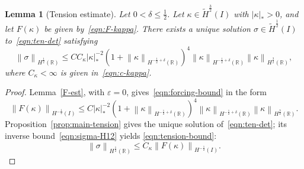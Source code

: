 \documentclass[11pt,reqno]{amsart}
\theoremstyle{plain}
\newtheorem{lemma}[theorem]{Lemma}
\theoremstyle{definition}
\numberwithin{equation}{section}
\newcommand{\paren}[1]{\left(#1\right)}
\newcommand{\wt}[1]{\widetilde{#1}}
\newcommand{\abs}[1]{\left\lvert #1 \right\rvert}
\newcommand{\norm}[1]{\left\lVert #1 \right\rVert}
\newcommand{\R}{\mathbb{R}}
\newcommand{\hi}[1]{H^{#1}(I)}
\newcommand{\thi}[1]{\wt H^{#1}(I)}
\newcommand{\hr}[1]{H^{#1}(\R)}
\begin{document}
\begin{lemma}[Tension estimate]\label{sigma-est-F}
Let $0<\delta\le\frac12$.
Let $\kappa\in\thi{\frac{3}{2}}$ with $\abs{\kappa}_*>0$, and let
$F(\kappa)$ be given by~\eqref{eqn:F-kappa}. There exists a unique solution
$\sigma\in\thi{\frac{1}{2}}$ to~\eqref{eqn:ten-det} satisfying
\begin{equation}\label{eqn:tension-bound}
    \norm{\sigma}_{\hr{\frac{1}{2}}} \le C C_\kappa \abs{\kappa}_*^{-2}\paren{1+\norm{\kappa}_{\hr{-\frac{1}{2}+\delta}}}^4\norm{\kappa}_{\hr{-\frac{1}{2}+\delta}}\norm{\kappa}_{\hr{\frac{3}{2}}},
\end{equation}
where $C_\kappa < \infty$ is given in~\eqref{eqn:c-kappa}.
\end{lemma}
\begin{proof}
Lemma~\ref{F-est}, with $\varepsilon=0$, gives~\eqref{eqn:forcing-bound} in the form
\begin{equation}
    \norm{F(\kappa)}_{\hi{-\frac12}}
    \le
    C\abs{\kappa}_*^{-2}
    \paren{1+\norm{\kappa}_{\hr{-\frac12+\delta}}}^4
    \norm{\kappa}_{\hr{-\frac12+\delta}}
    \norm{\kappa}_{\hr{\frac32}} .
\end{equation}
Proposition~\ref{prop:main-tension} gives the unique solution
of~\eqref{eqn:ten-det}; its inverse bound~\eqref{eqn:sigma-H12} yields
\eqref{eqn:tension-bound}:
\begin{equation}
    \norm{\sigma}_{\hr{\frac12}}
    \le C_\kappa\norm{F(\kappa)}_{\hi{-\frac12}}.
\end{equation}
\end{proof}
\end{document}

